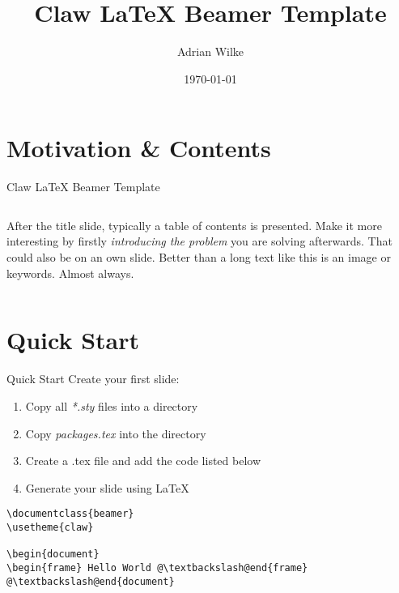 \documentclass{beamer}
\author[A.~Wilke]{Adrian Wilke}
\institute[DICE]{DICE Group\\Paderborn University}
\title[Claw LaTeX Beamer Template]{Claw LaTeX Beamer Template}
\subtitle{}
\date{\today}
\begin{document}
{\usebackgroundtemplate{}
\frame[plain]{\titlepage}}


\addtocounter{framenumber}{-1}

\section{Motivation \& Contents}

\begin{frame}{Claw LaTeX Beamer Template}
	\begin{columns}[T]
		After the title slide, typically a table of contents is presented. Make it more interesting by firstly \emph{introducing the problem} you are solving afterwards. That could also be on an own slide. Better than a long text like this is an image or keywords. Almost always.
		\vspace*{.2cm}
		\hypersetup{linkcolor=textblue}
		\tableofcontents
	\end{columns}
\end{frame}

\section{Quick Start}
\begin{frame}[fragile]{Quick Start}
	Create your first slide:
	\begin{enumerate}
		\item Copy all \emph{*.sty} files into a directory
		\item Copy \emph{packages.tex} into the directory
		\item Create a .tex file and add the code listed below
		\item Generate your slide using LaTeX
	\end{enumerate}
	\begin{lstlisting}[caption={Minimal Example}]
\documentclass{beamer}
\usetheme{claw}

\begin{document}
\begin{frame} Hello World @\textbackslash@end{frame}
@\textbackslash@end{document}
	\end{lstlisting}
\end{frame}
\end{document}
